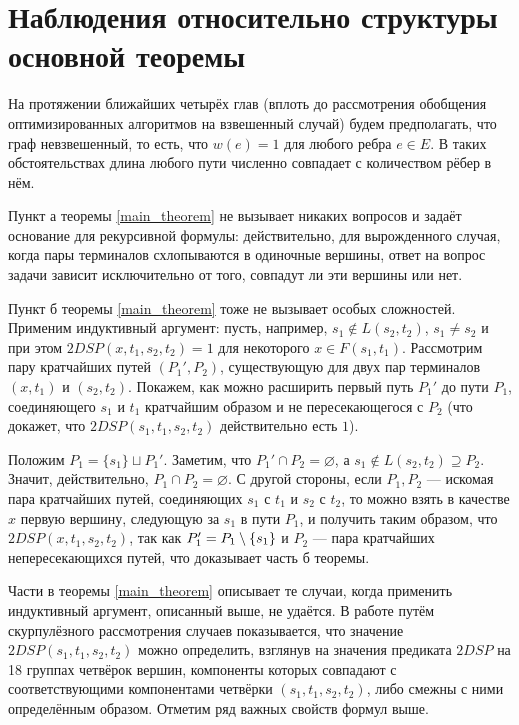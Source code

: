 \chapter{Наблюдения относительно структуры основной теоремы}

На протяжении ближайших четырёх глав (вплоть до рассмотрения обобщения оптимизированных алгоритмов на взвешенный случай) будем предполагать, что граф невзвешенный, то есть, что $w(e) = 1$ для любого ребра $e \in E$. В таких обстоятельствах длина любого пути численно совпадает с количеством рёбер в нём.

Пункт а теоремы \ref{main_theorem} не вызывает никаких вопросов и задаёт основание для рекурсивной формулы: действительно, для вырожденного случая, когда пары терминалов схлопываются в одиночные вершины, ответ на вопрос задачи зависит исключительно от того, совпадут ли эти вершины или нет.

Пункт б теоремы \ref{main_theorem} тоже не вызывает особых сложностей. Применим индуктивный аргумент: пусть, например, $s_1 \notin L(s_2, t_2)$, $s_1 \neq s_2$ и при этом $2DSP(x, t_1, s_2, t_2) = 1$ для некоторого $x \in F(s_1, t_1)$. Рассмотрим пару кратчайших путей $(P_1', P_2)$, существующую для двух пар терминалов $(x, t_1)$ и $(s_2, t_2)$. Покажем, как можно расширить первый путь $P_1'$ до пути $P_1$, соединяющего $s_1$ и $t_1$ кратчайшим образом и не пересекающегося с $P_2$ (что докажет, что $2DSP(s_1, t_1, s_2, t_2)$ действительно есть $1$).

Положим $P_1 = \{s_1\} \sqcup P_1'$. Заметим, что $P_1' \cap P_2 = \varnothing$, а $s_1 \notin L(s_2, t_2) \supseteq P_2$. Значит, действительно, $P_1 \cap P_2 = \varnothing$. С другой стороны, если $P_1, P_2$ --- искомая пара кратчайших путей, соединяющих $s_1$ с $t_1$ и $s_2$ с $t_2$, то можно взять в качестве $x$ первую вершину, следующую за $s_1$ в пути $P_1$, и получить таким образом, что $2DSP(x, t_1, s_2, t_2)$, так как $P_1' = P_1 \setminus \{s_1\}$ и $P_2$ --- пара кратчайших непересекающихся путей, что доказывает часть б теоремы.

Части в теоремы \ref{main_theorem} описывает те случаи, когда применить индуктивный аргумент, описанный выше, не удаётся. В работе \cite{ET} путём скурпулёзного рассмотрения случаев показывается, что значение $2DSP(s_1, t_1, s_2, t_2)$ можно определить, взглянув на значения предиката $2DSP$ на 18 группах четвёрок вершин, компоненты которых совпадают с соответствующими компонентами четвёрки $(s_1, t_1, s_2, t_2)$, либо смежны с ними определённым образом. Отметим ряд важных свойств формул выше.

